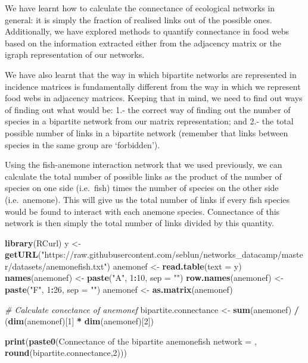 \documentclass[
]{article}
\newenvironment{Shaded}{\begin{snugshade}}{\end{snugshade}}
\newcommand{\AttributeTok}[1]{\textcolor[rgb]{0.13,0.29,0.53}{#1}}
\newcommand{\CommentTok}[1]{\textcolor[rgb]{0.56,0.35,0.01}{\textit{#1}}}
\newcommand{\DecValTok}[1]{\textcolor[rgb]{0.00,0.00,0.81}{#1}}
\newcommand{\FunctionTok}[1]{\textcolor[rgb]{0.13,0.29,0.53}{\textbf{#1}}}
\newcommand{\NormalTok}[1]{#1}
\newcommand{\OtherTok}[1]{\textcolor[rgb]{0.56,0.35,0.01}{#1}}
\newcommand{\SpecialCharTok}[1]{\textcolor[rgb]{0.81,0.36,0.00}{\textbf{#1}}}
\newcommand{\StringTok}[1]{\textcolor[rgb]{0.31,0.60,0.02}{#1}}
\begin{document}
We have learnt how to calculate the connectance of ecological networks
in general: it is simply the fraction of realised links out of the
possible ones. Additionally, we have explored methods to quantify
connectance in food webs based on the information extracted either from
the adjacency matrix or the igraph representation of our networks.

We have also learnt that the way in which bipartite networks are
represented in incidence matrices is fundamentally different from the
way in which we represent food webs in adjacency matrices. Keeping that
in mind, we need to find out ways of finding out what would be: 1.- the
correct way of finding out the number of species in a bipartite network
from our matrix representation; and 2.- the total possible number of
links in a bipartite network (remember that links between species in the
same group are `forbidden').

Using the fish-anemone interaction network that we used previously, we
can calculate the total number of possible links as the product of the
number of species on one side (i.e.~fish) times the number of species on
the other side (i.e.~anemone). This will give us the total number of
links if every fish species would be found to interact with each anemone
species. Connectance of this network is then simply the total number of
links divided by this quantity.

\begin{Shaded}
\begin{Highlighting}[]
\FunctionTok{library}\NormalTok{(RCurl)}
\NormalTok{y }\OtherTok{\textless{}{-}} \FunctionTok{getURL}\NormalTok{(}\StringTok{"https://raw.githubusercontent.com/seblun/networks\_datacamp/master/datasets/anemonefish.txt"}\NormalTok{)}
\NormalTok{anemonef }\OtherTok{\textless{}{-}} \FunctionTok{read.table}\NormalTok{(}\AttributeTok{text =}\NormalTok{ y)}
\FunctionTok{names}\NormalTok{(anemonef) }\OtherTok{\textless{}{-}} \FunctionTok{paste}\NormalTok{(}\StringTok{"A"}\NormalTok{, }\DecValTok{1}\SpecialCharTok{:}\DecValTok{10}\NormalTok{, }\AttributeTok{sep =} \StringTok{""}\NormalTok{)}
\FunctionTok{row.names}\NormalTok{(anemonef) }\OtherTok{\textless{}{-}} \FunctionTok{paste}\NormalTok{(}\StringTok{"F"}\NormalTok{, }\DecValTok{1}\SpecialCharTok{:}\DecValTok{26}\NormalTok{, }\AttributeTok{sep =} \StringTok{""}\NormalTok{)       }
\NormalTok{anemonef }\OtherTok{\textless{}{-}} \FunctionTok{as.matrix}\NormalTok{(anemonef)}

\CommentTok{\# Calculate conectance of anemonef}
\NormalTok{bipartite.connectance }\OtherTok{\textless{}{-}} \FunctionTok{sum}\NormalTok{(anemonef) }\SpecialCharTok{/}\NormalTok{ (}\FunctionTok{dim}\NormalTok{(anemonef)[}\DecValTok{1}\NormalTok{] }\SpecialCharTok{*} \FunctionTok{dim}\NormalTok{(anemonef)[}\DecValTok{2}\NormalTok{])}
      
\FunctionTok{print}\NormalTok{(}\FunctionTok{paste0}\NormalTok{(}\StringTok{\textquotesingle{}Connectance of the bipartite anemonefish network = \textquotesingle{}}\NormalTok{, }\FunctionTok{round}\NormalTok{(bipartite.connectance,}\DecValTok{2}\NormalTok{)))}
\end{Highlighting}
\end{Shaded}
\end{document}
